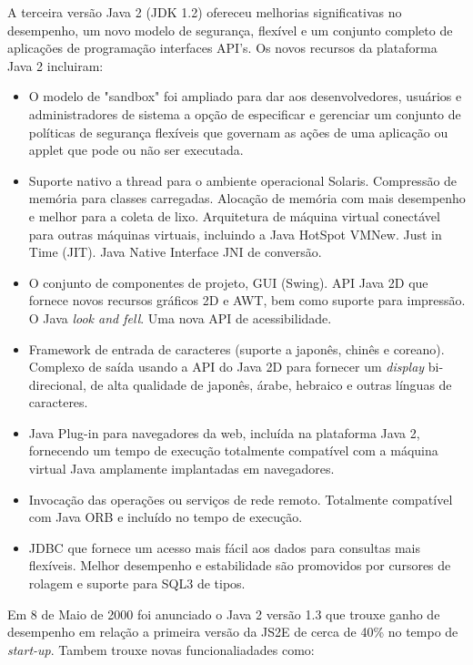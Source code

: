 A terceira versão Java 2 (\acs{JDK} 1.2) ofereceu melhorias significativas no desempenho, um novo modelo de segurança, flexível e um conjunto completo de aplicações de programação interfaces \acs{API}'s. Os novos recursos da plataforma Java 2 incluiram: 
\begin{itemize}
  \item O modelo de "sandbox"  foi ampliado para dar aos desenvolvedores, usuários e administradores de sistema a opção de especificar e gerenciar um conjunto de políticas de segurança flexíveis que governam as ações de uma aplicação ou applet que pode ou não ser executada.
  \item Suporte nativo a thread para o ambiente operacional Solaris. Compressão de memória para classes carregadas. Alocação de memória com mais desempenho e melhor para a coleta de lixo. Arquitetura de máquina virtual conectável para outras máquinas virtuais, incluindo a Java HotSpot VMNew. Just in Time (JIT). Java Native Interface \acs{JNI} de conversão.
  \item O conjunto de componentes de projeto, \acs{GUI} (Swing). \acs{API} Java 2D que fornece novos recursos gráficos 2D e \acs{AWT}, bem como suporte para impressão. O Java {\it look and fell}. Uma nova API de acessibilidade.
  \item Framework de entrada de caracteres (suporte a japonês, chinês e coreano). Complexo de saída usando a \acs{API} do Java 2D para fornecer um {\it display} bi-direcional, de alta qualidade de japonês, árabe, hebraico e outras línguas de caracteres.
  \item Java Plug-in para navegadores da web, incluída na plataforma Java 2, fornecendo um tempo de execução totalmente compatível com a máquina virtual Java amplamente implantadas em navegadores.
  \item Invocação das operações ou serviços de rede remoto. Totalmente compatível com Java ORB e incluído no tempo de execução.
  \item \acs{JDBC} que fornece um acesso mais fácil aos dados para consultas mais flexíveis. Melhor desempenho e estabilidade são promovidos por cursores de rolagem e suporte para SQL3 de tipos.\\
\end{itemize}

Em 8 de Maio de 2000 foi anunciado o Java 2 versão 1.3 que trouxe ganho de desempenho em relação a primeira versão da JS2E de cerca de 40\%  no tempo de {\it  start-up}. Tambem trouxe novas funcionaliadades como: 

